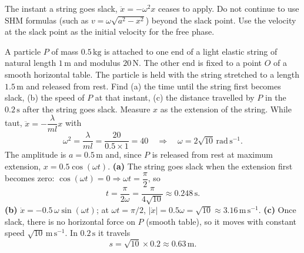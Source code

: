 \documentclass[11pt]{article}
\begin{document}
\begin{attention}
The instant a string goes slack, $\ddot{x} = -\omega^2 x$ ceases to apply. Do not continue to use SHM formulas (such as $v = \omega\sqrt{a^2-x^2}$) beyond the slack point. Use the velocity at the slack point as the initial velocity for the free phase.
\end{attention}

\begin{exoresolu}
A particle $P$ of mass $0.5\,\mathrm{kg}$ is attached to one end of a light elastic string of natural length $1\,\mathrm{m}$ and modulus $20\,\mathrm{N}$. The other end is fixed to a point $O$ of a smooth horizontal table. The particle is held with the string stretched to a length $1.5\,\mathrm{m}$ and released from rest. Find (a) the time until the string first becomes slack, (b) the speed of $P$ at that instant, (c) the distance travelled by $P$ in the $0.2\,\mathrm{s}$ after the string goes slack.
\tcblower
Measure $x$ as the extension of the string. While taut, $\ddot{x} = -\dfrac{\lambda}{ml}x$ with
\[
\omega^2 = \frac{\lambda}{ml} = \frac{20}{0.5 \times 1} = 40 \quad\Rightarrow\quad \omega = 2\sqrt{10}\,\mathrm{rad\,s^{-1}}.
\]
The amplitude is $a = 0.5\,\mathrm{m}$ and, since $P$ is released from rest at maximum extension, $x = 0.5\cos(\omega t)$.
\textbf{(a)} The string goes slack when the extension first becomes zero: $\cos(\omega t) = 0 \Rightarrow \omega t = \dfrac{\pi}{2}$, so
\[
t = \frac{\pi}{2\omega} = \frac{\pi}{4\sqrt{10}} \approx 0.248\,\mathrm{s}.
\]
\textbf{(b)} $\dot{x} = -0.5\,\omega \sin(\omega t)$; at $\omega t = \pi/2$, $|\dot{x}| = 0.5\omega = \sqrt{10} \approx 3.16\,\mathrm{m\,s^{-1}}$.
\textbf{(c)} Once slack, there is no horizontal force on $P$ (smooth table), so it moves with constant speed $\sqrt{10}\,\mathrm{m\,s^{-1}}$. In $0.2\,\mathrm{s}$ it travels
\[
s = \sqrt{10} \times 0.2 \approx 0.63\,\mathrm{m}.
\]
\end{exoresolu}
\end{document}
